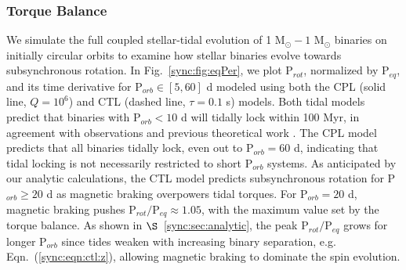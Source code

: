 \subsubsection{Torque Balance} \label{sync:sec:mattBalance}

We simulate the full coupled stellar-tidal evolution of 1 M$_{\odot} - 1$ M$_{\odot}$ binaries on initially circular orbits to examine how stellar binaries evolve towards subsynchronous rotation. In Fig.~\ref{sync:fig:eqPer}, we plot P$_{rot}$, normalized by P$_{eq}$, and its time derivative for P$_{orb} \in [5,60]$ d modeled using both the CPL (solid line, $Q=10^6$) and CTL (dashed line, $\tau = 0.1$ s) models. Both tidal models predict that binaries with P$_{orb} < 10$ d will tidally lock within 100 Myr, in agreement with observations \citep{Meibom2005} and previous theoretical work \citep{Zahn1989}. The CPL model predicts that all binaries tidally lock, even out to P$_{orb} = 60$ d, indicating that tidal locking is not necessarily restricted to short P$_{orb}$ systems. As anticipated by our analytic calculations, the CTL model predicts subsynchronous rotation for P$_{orb} \geq 20$ d as magnetic braking overpowers tidal torques. For P$_{orb} = 20$ d, magnetic braking pushes P$_{rot}/$P$_{eq} \approx 1.05$, with the maximum value set by the torque balance. As shown in $\S$~\ref{sync:sec:analytic}, the peak P$_{rot}/$P$_{eq}$ grows for longer P$_{orb}$ since tides weaken with increasing binary separation, e.g. Eqn.~(\ref{sync:eqn:ctl:z}), allowing magnetic braking to dominate the spin evolution. 

